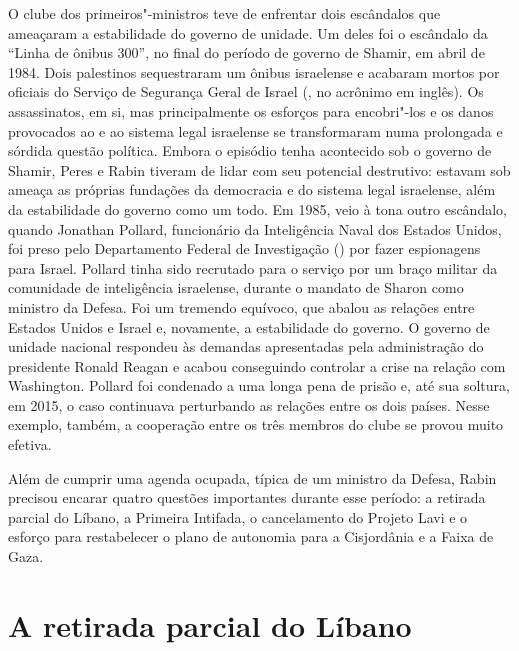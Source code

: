 O clube dos primeiros"-ministros teve de enfrentar dois escândalos que
ameaçaram a estabilidade do governo de unidade. Um deles foi o escândalo
da ``Linha de ônibus 300'', no final do período de governo de Shamir, em
abril de 1984. Dois palestinos sequestraram um ônibus israelense e
acabaram mortos por oficiais do Serviço de Segurança Geral de Israel (, no
acrônimo em inglês). Os assassinatos, em si, mas principalmente os esforços
para encobri"-los e os danos provocados ao  e ao sistema legal
israelense se transformaram numa prolongada e sórdida questão política.
Embora o episódio tenha acontecido sob o governo de Shamir, Peres e
Rabin tiveram de lidar com seu potencial destrutivo: estavam sob ameaça
as próprias fundações da democracia e do sistema legal israelense, além
da estabilidade do governo como um todo. Em 1985, veio à tona outro
escândalo, quando Jonathan Pollard, funcionário da Inteligência Naval
dos Estados Unidos, foi preso pelo Departamento Federal de Investigação () por fazer espionagens para
Israel. Pollard tinha sido recrutado para o serviço por um braço militar
da comunidade de inteligência israelense, durante o mandato de Sharon
como ministro da Defesa. Foi um tremendo equívoco, que abalou as
relações entre Estados Unidos e Israel e, novamente, a estabilidade do
governo. O governo de unidade nacional respondeu às demandas
apresentadas pela administração do presidente Ronald Reagan e acabou
conseguindo controlar a crise na relação com Washington. Pollard foi
condenado a uma longa pena de prisão e, até sua soltura, em 2015, o caso
continuava perturbando as relações entre os dois países. Nesse exemplo,
também, a cooperação entre os três membros do clube se provou muito
efetiva.

Além de cumprir uma agenda ocupada, típica de um ministro da Defesa,
Rabin precisou encarar quatro questões importantes durante esse período:
a retirada parcial do Líbano, a Primeira Intifada, o cancelamento do
Projeto Lavi e o esforço para restabelecer o plano de autonomia para a
Cisjordânia e a Faixa de Gaza.

\section{A retirada parcial do Líbano}

